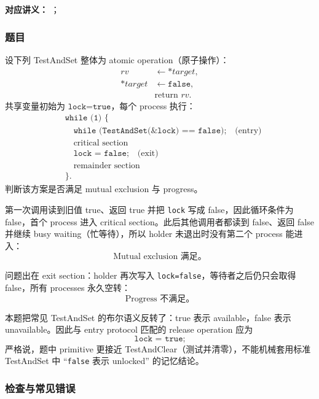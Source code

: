 
\textbf{对应讲义：}
；

\subsubsection*{题目}

设下列 TestAndSet 整体为 atomic operation（原子操作）：
\[
\begin{aligned}
  rv &\gets *target,\\
  *target &\gets \texttt{false},\\
  &\text{return }rv.
\end{aligned}
\]
共享变量初始为 $\texttt{lock=true}$，每个 process 执行：
\[
\begin{aligned}
  &\texttt{while (1) \{}\\
  &\quad\texttt{while (TestAndSet(\&lock) == false);}\quad\text{(entry)}\\
  &\quad\text{critical section}\\
  &\quad\texttt{lock = false;}\quad\text{(exit)}\\
  &\quad\text{remainder section}\\
  &\texttt{\}}.
\end{aligned}
\]
判断该方案是否满足 mutual exclusion 与 progress。

\begin{checkedsolution}
第一次调用读到旧值 true、返回 true 并把 \texttt{lock} 写成 false，因此循环条件为 false，首个 process 进入 critical section。此后其他调用者都读到 false、返回 false 并继续 busy waiting（忙等待），所以 holder 未退出时没有第二个 process 能进入：
\[
  \boxed{\text{Mutual exclusion 满足。}}
\]

问题出在 exit section：holder 再次写入 \texttt{lock=false}，等待者之后仍只会取得 false，所有 processes 永久空转：
\[
  \boxed{\text{Progress 不满足。}}
\]

本题把常见 TestAndSet 的布尔语义反转了：true 表示 available，false 表示 unavailable。因此与 entry protocol 匹配的 release operation 应为
\[
  \boxed{\texttt{lock = true;}}
\]
严格说，题中 primitive 更接近 TestAndClear（测试并清零），不能机械套用标准 TestAndSet 中 ``\texttt{false} 表示 unlocked'' 的记忆结论。
\end{checkedsolution}

\subsubsection*{检查与常见错误}

